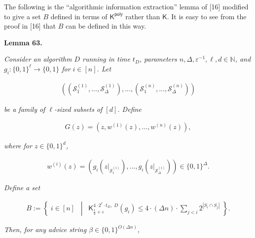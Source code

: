 \documentclass[10pt,a4paper]{article}
\begin{document}



The following is the “algorithmic information extraction” lemma of [16] modified to give a set $B$ defined in terms of ${\mathsf{K}}^{{\mathsf{poly}}}$ rather than ${\mathsf{K}}$. It is easy to see from the proof in [16] that $B$ can be defined in this way.\par





\par\medskip\noindent\textbf{
\textbf{Lemma 63}\textbf{.}
}\par



\emph{Consider an algorithm $D$ running in time $t_{D}$, parameters $n,\Delta,\varepsilon^{-1},\ell,d\in\mathbb{N}$, and $g_{i}:\{0,1\}^{\ell}\to\{0,1\}$ for $i\in[n]$. Let}\par


\[\begin{gathered}
\left(\left(\mathcal{S}^{(1)}_{1},...,\mathcal{S}^{(1)}_{\Delta}\right),...,\left(\mathcal{S}^{(n)}_{1},...,\mathcal{S}^{(n)}_{\Delta}\right)\right)
\end{gathered}\]


\emph{be a family of $\ell$-sized subsets of $[d]$. Define}\par


\[\begin{gathered}
G(z)=\left(z,w^{(1)}(z),...,w^{(n)}(z)\right),
\end{gathered}\]


\emph{where for $z\in\{0,1\}^{d}$,}\par


\[\begin{gathered}
w^{(i)}(z)=\left(g_{i}\left(z|_{\mathcal{S}^{(i)}_{1}}\right),...,g_{i}\left(z|_{\mathcal{S}^{(i)}_{\Delta}}\right)\right)\in\{0,1\}^{\Delta}.
\end{gathered}\]


\emph{Define a set}\par


\[\begin{gathered}
B:=\left\{\;i\in[n]\;\;\middle|\;\;{\mathsf{K}}^{4\cdot 2^{\ell}\cdot t_{D},\;D}_{\frac{1}{2}+\varepsilon}(g_{i})\leq 4\cdot(\Delta n)\cdot\sum_{j<i}2^{|S_{i}\cap S_{j}|}\;\right\}.
\end{gathered}\]


\emph{Then, for any advice string $\beta\in\{0,1\}^{O(\Delta n)}$,}\par
\end{document}
